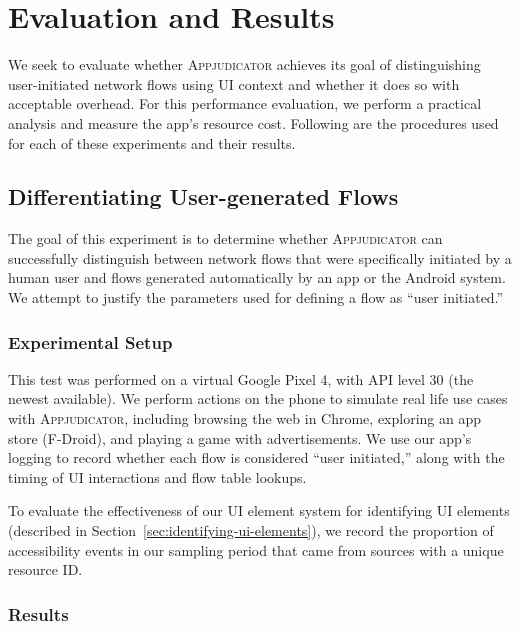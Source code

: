 \section{Evaluation and Results}
\label{sec:evaluation-and-results}

We seek to evaluate whether \textsc{Appjudicator} achieves its goal of
distinguishing user-initiated network flows using UI context and whether it does
so with acceptable overhead. For this performance evaluation, we perform a
practical analysis and measure the app's resource cost. Following are the
procedures used for each of these experiments and their results.

\subsection{Differentiating User-generated Flows}
\label{sec:differentiating-user-generated-flows}

The goal of this experiment is to determine whether \textsc{Appjudicator} can
successfully distinguish between network flows that were specifically initiated
by a human user and flows generated automatically by an app or the Android
system. We attempt to justify the parameters used for defining a flow as ``user
initiated.''

\subsubsection{Experimental Setup}
\label{sec:experimental-setup}

This test was performed on a virtual Google Pixel 4, with API level 30 (the
newest available). We perform actions on the phone to simulate real life use
cases with \textsc{Appjudicator}, including browsing the web in Chrome,
exploring an app store (F-Droid), and playing a game with advertisements. We use
our app's logging to record whether each flow is considered ``user initiated,''
along with the timing of UI interactions and flow table lookups.

To evaluate the effectiveness of our UI element system for identifying UI
elements (described in Section~\ref{sec:identifying-ui-elements}), we record the
proportion of accessibility events in our sampling period that came from sources
with a unique resource ID.

\subsubsection{Results}
\label{sec:practical-results}

